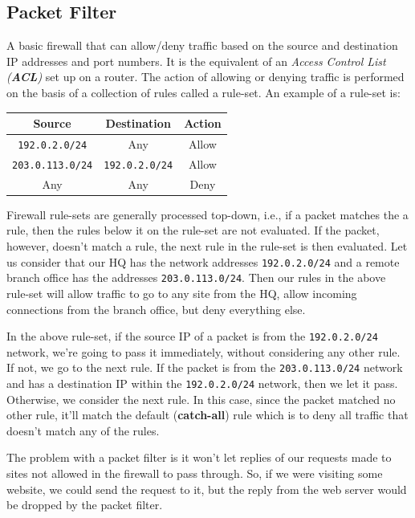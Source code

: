 \subsection{Packet Filter}
A basic firewall that can allow/deny traffic based on the source and destination IP addresses and port numbers. It is the equivalent of an \textit{Access Control List (\textbf{ACL})} set up on a router. The action of allowing or denying traffic is performed on the basis of a collection of rules called a rule-set. An example of a rule-set is:

\vspace{-10pt}
\begin{center}
	\begin{tabular}{ccc}
		\toprule
		\textbf{Source} &\textbf{Destination} &\textbf{Action} \\
		\midrule
		\verb|192.0.2.0/24| &Any &Allow \\
		\verb|203.0.113.0/24| &\verb|192.0.2.0/24| &Allow \\
		Any &Any &Deny \\
		\bottomrule	
	\end{tabular}
\end{center}
\vspace{-10pt}

\noindent
Firewall rule-sets are generally processed top-down, i.e., if a packet matches the a rule, then the rules below it on the rule-set are not evaluated. If the packet, however, doesn't match a rule, the next rule in the rule-set is then evaluated. Let us consider that our HQ has the network addresses \verb|192.0.2.0/24| and a remote branch office has the addresses \verb|203.0.113.0/24|. Then our rules in the above rule-set will allow traffic to go to any site from the HQ, allow incoming connections from the branch office, but deny everything else. 

In the above rule-set, if the source IP of a packet is from the \verb|192.0.2.0/24| network, we're going to pass it immediately, without considering any other rule. If not, we go to the next rule. If the packet is from the \verb|203.0.113.0/24| network and has a destination IP within the \verb|192.0.2.0/24| network, then we let it pass. Otherwise, we consider the next rule. In this case, since the packet matched no other rule, it'll match the default (\textbf{catch-all}) rule which is to deny all traffic that doesn't match any of the rules. 

The problem with a packet filter is it won't let replies of our requests made to sites not allowed in the firewall to pass through. So, if we were visiting some website, we could send the request to it, but the reply from the web server would be dropped by the packet filter. 

